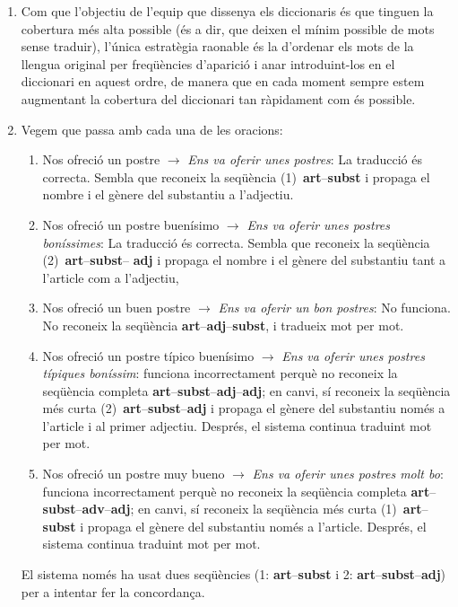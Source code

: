 \begin{enumerate}
    

\item Com que l'objectiu de l'equip que dissenya els diccionaris és
  que tinguen la cobertura més alta possible (és a dir, que deixen el
  mínim possible de mots sense traduir), l'única estratègia raonable
  és la d'ordenar els mots de la llengua original per freqüències
  d'aparició i anar introduint-los en el diccionari en aquest ordre,
  de manera que en cada moment sempre estem augmentant la cobertura
  del diccionari tan ràpidament com és possible.

\item Vegem que passa amb cada una de les oracions:
  \begin{enumerate}
  \item {\sf Nos ofreció un postre} $\rightarrow$ {\em Ens va oferir
      unes postres\/}: La traducció és correcta. Sembla que reconeix
    la seqüència (1)~{\bf art}--{\bf subst} i propaga el nombre i el
    gènere del substantiu a l'adjectiu.
  \item {\sf Nos ofreció un postre buenísimo} $\rightarrow$ {\em Ens
      va oferir unes postres boníssimes\/}: La traducció és correcta.
    Sembla que reconeix la seqüència (2)~{\bf art}--{\bf subst}--{\bf
      adj} i propaga el nombre i el gènere del substantiu tant a
    l'article com a l'adjectiu,
  \item {\sf Nos ofreció un buen postre} $\rightarrow$ {\em *Ens va
      oferir un bon postres}: No funciona. No reconeix la seqüència
    {\bf art}--{\bf adj}--{\bf subst}, i tradueix mot per mot.
  \item {\sf Nos ofreció un postre típico buenísimo\/} $\rightarrow$
    {\em *Ens va oferir unes postres típiques boníssim}: funciona
    incorrectament perquè no reconeix la seqüència completa {\bf
      art}--{\bf subst}--{\bf adj}--{\bf adj}; en canvi, sí reconeix
    la seqüència més curta (2)~{\bf art}--{\bf subst}--{\bf adj} i
    propaga el gènere del substantiu només a l'article i al primer
    adjectiu. Després, el sistema continua traduint mot per mot.
  \item {\sf Nos ofreció un postre muy bueno} $\rightarrow$ {\em *Ens
      va oferir unes postres molt bo\/}: funciona incorrectament
    perquè no reconeix la seqüència completa {\bf art}--{\bf
      subst}--{\bf adv}--{\bf adj}; en canvi, sí reconeix la seqüència
    més curta (1)~{\bf art}--{\bf subst} i propaga el gènere del
    substantiu només a l'article. Després, el sistema continua
    traduint mot per mot.
\end{enumerate}
El sistema només ha usat dues seqüències (1: {\bf art}--{\bf subst} i
2: {\bf art}--{\bf subst}--{\bf adj}) per a intentar fer la
concordança.


\end{enumerate}
